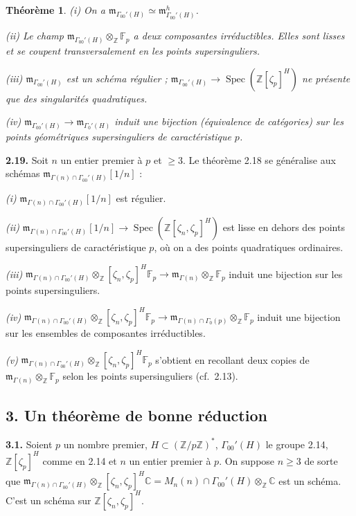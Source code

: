\documentclass[10pt,a4paper]{amsart}
\theoremstyle{plain}
\newtheorem{theorem}{Th\'eor\`eme}[section]
\theoremstyle{definition}
\DeclareMathOperator{\Spec}{Spec}
\newcommand{\m}{\mathfrak{m}}
\newcommand{\FF}{\mathbb{F}}
\newcommand{\ZZ}{\mathbb{Z}}
\newcommand{\CC}{\mathbb{C}}
\begin{document}
\setcounter{theorem}{17}
\begin{theorem}
\emph{(i)} On a $\m_{\Gamma_{00}'(H)} \simeq \m_{\Gamma_{00}'(H)}^h$.

\emph{(ii)} Le champ $\m_{\Gamma_{00}'(H)} \otimes_\ZZ \FF_p$ a deux composantes irr\'eductibles. Elles sont lisses et se coupent transversalement en les points supersinguliers.

\emph{(iii)} $\m_{\Gamma_{00}'(H)}$ est un sch\'ema r\'egulier ; $\m_{\Gamma_{00}'(H)} \to \Spec(\ZZ[\zeta_p]^H)$ ne pr\'esente que des singularit\'es quadratiques.

\emph{(iv)} $\m_{\Gamma_{00}'(H)} \to \m_{\Gamma_0'(H)}$ induit une bijection (\'equivalence de cat\'egories) sur les points g\'eom\'etriques supersinguliers de caract\'eristique $p$.
\end{theorem}

\medskip\noindent\textbf{2.19.} Soit $n$ un entier premier \`a $p$ et $\geq 3$. Le th\'eor\`eme 2.18 se g\'en\'eralise aux sch\'emas $\m_{\Gamma(n) \cap \Gamma_{00}'(H)}[1/n]$ :

\emph{(i)} $\m_{\Gamma(n) \cap \Gamma_{00}'(H)}[1/n]$ est r\'egulier.

\emph{(ii)} $\m_{\Gamma(n) \cap \Gamma_{00}'(H)}[1/n] \to \Spec(\ZZ[\zeta_n, \zeta_p]^H)$ est lisse en dehors des points supersinguliers de caract\'eristique $p$, o\`u on a des points quadratiques ordinaires.

\emph{(iii)} $\m_{\Gamma(n) \cap \Gamma_{00}'(H)} \otimes_\ZZ[\zeta_n,\zeta_p]^H \FF_p \to \m_{\Gamma(n)} \otimes_\ZZ \FF_p$ induit une bijection sur les points supersinguliers.

\emph{(iv)} $\m_{\Gamma(n) \cap \Gamma_{00}'(H)} \otimes_\ZZ[\zeta_n,\zeta_p]^H \FF_p \to \m_{\Gamma(n) \cap \Gamma_0(p)} \otimes_\ZZ \FF_p$ induit une bijection sur les ensembles de composantes irr\'eductibles.

\emph{(v)} $\m_{\Gamma(n) \cap \Gamma_{00}'(H)} \otimes_\ZZ[\zeta_n,\zeta_p]^H \FF_p$ s'obtient en recollant deux copies de $\m_{\Gamma(n)} \otimes_\ZZ \FF_p$ selon les points supersinguliers (cf.\ 2.13).


\subsection*{3. Un th\'eor\`eme de bonne r\'eduction}

\setcounter{theorem}{0}
\setcounter{subsection}{2}
\setcounter{theorem}{0}

\medskip\noindent\textbf{3.1.} Soient $p$ un nombre premier, $H \subset (\ZZ/p\ZZ)^*$, $\Gamma_{00}'(H)$ le groupe 2.14, $\ZZ[\zeta_p]^H$ comme en 2.14 et $n$ un entier premier \`a $p$. On suppose $n \geq 3$ de sorte que $\m_{\Gamma(n) \cap \Gamma_{00}'(H)} \otimes_\ZZ[\zeta_n,\zeta_p]^H \CC = M_n(n) \cap \Gamma_{00}'(H) \otimes_\ZZ \CC$ est un sch\'ema. C'est un sch\'ema sur $\ZZ[\zeta_n,\zeta_p]^H$.
\end{document}
